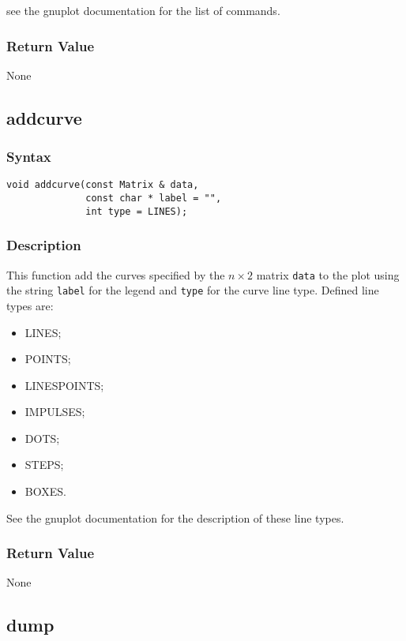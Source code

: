 \documentclass[11pt,fleqn,letterpaper]{report}
\begin{document}
 see the \textsf{gnuplot} documentation for the list
of commands.

\subsubsection*{Return Value}

None 

\newpage

\subsection*{addcurve}
\subsubsection*{Syntax}
\begin{verbatim}
void addcurve(const Matrix & data, 
              const char * label = "", 
              int type = LINES);
\end{verbatim}
\subsubsection*{Description}
This function add the curves specified by the $n \times 2$ matrix
{\tt data} to the plot using the string {\tt label} for the legend
and {\tt type} for the curve line type. Defined line types are:
\begin{itemize}
\item LINES;
\item POINTS;
\item LINESPOINTS;
\item IMPULSES;
\item DOTS;
\item STEPS;
\item BOXES.
\end{itemize}
See the \textsf{gnuplot} documentation for the description of these line
types.


\subsubsection*{Return Value}

None

\newpage

\subsection*{dump}
\end{document}
